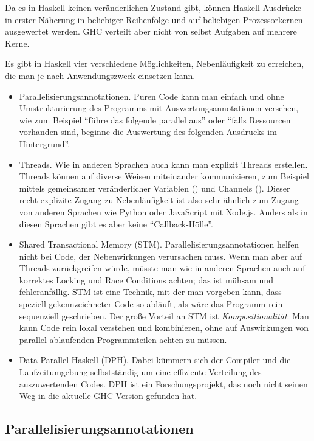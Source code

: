 \documentclass{uebblatt}
\begin{document}
Da es in Haskell keinen veränderlichen Zustand gibt, können Haskell-Ausdrücke
in erster Näherung in beliebiger Reihenfolge und auf beliebigen Prozessorkernen
ausgewertet werden. GHC verteilt aber nicht von selbst Aufgaben auf mehrere
Kerne.

Es gibt in Haskell vier verschiedene Möglichkeiten, Nebenläufigkeit zu
erreichen, die man je nach Anwendungszweck einsetzen kann.

\begin{itemize}
\item Parallelisierungsannotationen. Puren Code kann man einfach und ohne
Umstrukturierung des Programms mit Auswertungsannotationen versehen, wie zum
Beispiel "`führe das folgende  parallel aus"' oder "`falls
Ressourcen vorhanden sind, beginne die Auswertung des folgenden Ausdrucks im
Hintergrund"'.
\item Threads. Wie in anderen Sprachen auch kann man explizit Threads
erstellen. Threads können auf diverse Weisen miteinander kommunizieren, zum
Beispiel mittels gemeinsamer veränderlicher Variablen ()
und Channels (). Dieser recht explizite Zugang zu
Nebenläufigkeit ist also sehr ähnlich zum Zugang von anderen Sprachen wie
Python oder JavaScript mit Node.js. Anders als in diesen Sprachen gibt es aber
keine "`Callback-Hölle"'.
\item Shared Transactional Memory (STM). Parallelisierungsannotationen helfen
nicht bei Code, der Nebenwirkungen verursachen muss. Wenn man aber auf Threads
zurückgreifen würde, müsste man wie in anderen Sprachen auch auf korrektes
Locking und Race Conditions achten; das ist mühsam und fehleranfällig. STM ist
eine Technik, mit der man vorgeben kann, dass speziell gekennzeichneter Code so
abläuft, als wäre das Programm rein sequenziell geschrieben. Der große Vorteil
an STM ist \emph{Kompositionalität}: Man kann Code rein lokal verstehen und
kombinieren, ohne auf Auswirkungen von parallel ablaufenden Programmteilen
achten zu müssen.
\item Data Parallel Haskell (DPH). Dabei kümmern sich der Compiler und die
Laufzeitumgebung selbstständig um eine effiziente Verteilung des auszuwertenden
Codes. DPH ist ein Forschungsprojekt, das noch nicht seinen Weg in die
aktuelle GHC-Version gefunden hat.
\end{itemize}


\subsection{Parallelisierungsannotationen}
\end{document}
